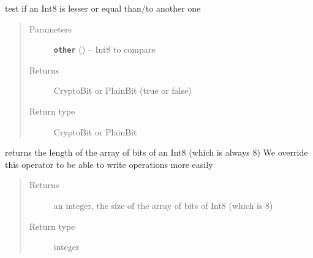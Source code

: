 \documentclass[letterpaper,10pt,english]{sphinxmanual}
\begin{document}
\begin{fulllineitems}
\begin{fulllineitems}
\end{fulllineitems}


\begin{fulllineitems}
\label{datatypes.integers:datatypes.integers.Int8.Int8.__le__}
test if an Int8 is lesser or equal than/to another one
\begin{quote}\begin{description}
\item[{Parameters}] \leavevmode
\textbf{\texttt{other}} ({\hyperref[datatypes.integers:datatypes.integers.Int8.Int8]{}}) -- Int8 to compare

\item[{Returns}] \leavevmode
CryptoBit or PlainBit (true or false)

\item[{Return type}] \leavevmode
CryptoBit or PlainBit

\end{description}\end{quote}

\end{fulllineitems}


\begin{fulllineitems}
\label{datatypes.integers:datatypes.integers.Int8.Int8.__len__}
returns the length of the array of bits of an Int8 (which is always 8)
We override this operator to be able to write operations more easily
\begin{quote}\begin{description}
\item[{Returns}] \leavevmode
an integer, the size of the array of bits of Int8 (which is 8)

\item[{Return type}] \leavevmode
integer

\end{description}\end{quote}

\end{fulllineitems}



\end{fulllineitems}
\end{document}
